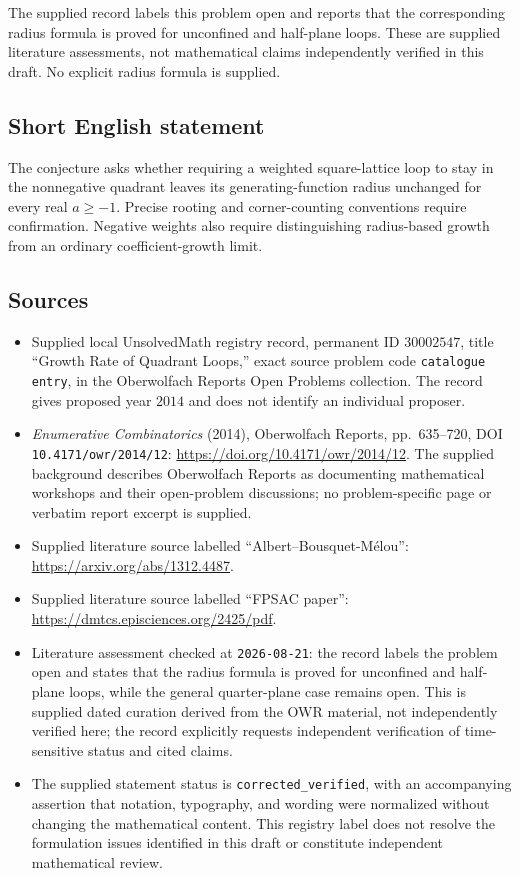 \documentclass[11pt]{article}
\begin{document}
The supplied record labels this problem open and reports that the corresponding radius formula is proved for unconfined and half-plane loops. These are supplied literature assessments, not mathematical claims independently verified in this draft. No explicit radius formula is supplied.
\subsection{Short English statement}
The conjecture asks whether requiring a weighted square-lattice loop to stay in the nonnegative quadrant leaves its generating-function radius unchanged for every real \(a\geq-1\). Precise rooting and corner-counting conventions require confirmation. Negative weights also require distinguishing radius-based growth from an ordinary coefficient-growth limit.
\subsection{Sources}
\begin{itemize}
\item Supplied local UnsolvedMath registry record, permanent ID \(30002547\), title ``Growth Rate of Quadrant Loops,'' exact source problem code \texttt{catalogue entry}, in the Oberwolfach Reports Open Problems collection. The record gives proposed year \(2014\) and does not identify an individual proposer.
\item \emph{Enumerative Combinatorics} (2014), Oberwolfach Reports, pp.~635--720, DOI \texttt{10.4171/owr/2014/12}: \url{https://doi.org/10.4171/owr/2014/12}. The supplied background describes Oberwolfach Reports as documenting mathematical workshops and their open-problem discussions; no problem-specific page or verbatim report excerpt is supplied.
\item Supplied literature source labelled ``Albert--Bousquet-M\'elou'': \url{https://arxiv.org/abs/1312.4487}.
\item Supplied literature source labelled ``FPSAC paper'': \url{https://dmtcs.episciences.org/2425/pdf}.
\item Literature assessment checked at \texttt{2026-08-21}: the record labels the problem open and states that the radius formula is proved for unconfined and half-plane loops, while the general quarter-plane case remains open. This is supplied dated curation derived from the OWR material, not independently verified here; the record explicitly requests independent verification of time-sensitive status and cited claims.
\item The supplied statement status is \texttt{corrected\_verified}, with an accompanying assertion that notation, typography, and wording were normalized without changing the mathematical content. This registry label does not resolve the formulation issues identified in this draft or constitute independent mathematical review.
\end{itemize}
\end{document}
